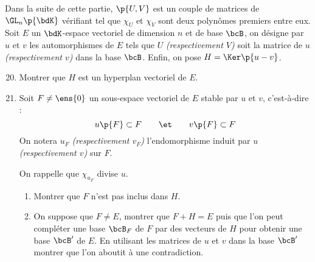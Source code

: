 \documentclass[a4paper,french,bookmarks]{article}
\begin{document}
    Dans la suite de cette partie, $\p{U, V}$ est un couple de matrices de $\GL_n\p{\bdK}$ vérifiant \enumrefraw{(*)} tel que $\chi_U$ et $\chi_V$ sont deux polynômes premiers entre eux. Soit $E$ un $\bdK$-espace vectoriel de dimension $n$ et de base $\bcB$, on désigne par $u$ et $v$ les automorphismes de $E$ tels que $U$ \emph{(respectivement $V$)} soit la matrice de $u$ \emph{(respectivement $v$)} dans la base $\bcB$. Enfin, on pose $H = \Ker\p{u-v}$.
        
    \begin{enumerate}
        \setcounter{enumi}{19}
        \item Montrer que $H$ est un hyperplan vectoriel de $E$.

        
        \item Soit $F \neq \ens{0}$ un sous-espace vectoriel de $E$ stable par $u$ et $v$, c'est-à-dire :
        \[ u\p{F} \subset F \qquad\et\qquad v\p{F} \subset F\]
        On notera $u_F$ \emph{(respectivement $v_F$)} l'endomorphisme induit par $u$ \emph{(respectivement $v$)} sur $F$.
        
        On rappelle que $\chi_{u_F}$ divise $u$.
        
        \begin{enumerate}
            \item Montrer que $F$ n'est pas inclus dans $H$.
            
            
            \item On suppose que $F \neq E$, montrer que $F + H = E$ puis que l'on peut compléter une base $\bcB_F$ de $F$ par des vecteurs de $H$ pour obtenir une base $\bcB'$ de $E$. En utilisant les matrices de $u$ et $v$ dans la base $\bcB'$ montrer que l'on aboutit à une contradiction.
            
            \noafter
\end{enumerate}
\end{enumerate}
\end{document}
